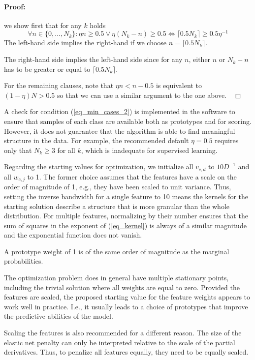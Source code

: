 \paragraph{Proof:} we show first that for any $k$ holds
%
\begin{equation}
\forall n\in\{0,\dots,N_k\}:\eta n\geq0.5\vee\eta(N_k-n)\geq0.5\iff\lceil0.5N_k\rceil\geq0.5\eta^{-1}\label{eq_condition_proof}
\end{equation}
%
The left-hand side implies the right-hand if we choose $n=\lceil0.5N_k\rceil$.\par
%
The right-hand side implies the left-hand side since for any $n$, either $n$ or $N_k-n$ has to be greater or equal to $\lceil0.5N_k\rceil$.\par
%
For the remaining clauses, note that $\eta n<n-0.5$ is equivalent to $(1-\eta)N>0.5$ so that we can use a similar argument to the one above.$\quad\Box$\par
%
A check for condition (\ref{eq_min_cases_2}) is implemented in the software to ensure that samples of each class are available both as prototypes and for scoring.
However, it does not guarantee that the algorithm is able to find meaningful structure in the data.
For example, the recommended default $\eta=0.5$ requires only that $N_k\geq3$ for all $k$, which is inadequate for supervised learning.\par
%
Regarding the starting values for optimization, we initialize all $v_{c,d}$ to $10D^{-1}$ and all $w_{c,j}$ to 1.
The former choice assumes that the features have a scale on the order of magnitude of 1, e.g., they have been scaled to unit variance.
Thus, setting the inverse bandwidth for a single feature to 10 means the kernels for the starting solution describe a structure that is more granular than the whole distribution.
For multiple features, normalizing by their number ensures that the sum of squares in the exponent of (\ref{eq_kernel}) is always of a similar magnitude and the exponential function does not vanish.\par
%
A prototype weight of 1 is of the same order of magnitude as the marginal probabilities.
%
\begin{remark}
The optimization problem does in general have multiple stationary points, including the trivial solution where all weights are equal to zero.
Provided the features are scaled, the proposed starting value for the feature weights appears to work well in practice.
I.e., it usually leads to a choice of prototypes that improve the predictive abilities of the model.\par
%
Scaling the features is also recommended for a different reason.
The size of the elastic net penalty can only be interpreted relative to the scale of the partial derivatives.
Thus, to penalize all features equally, they need to be equally scaled.
\end{remark}
\endinput
